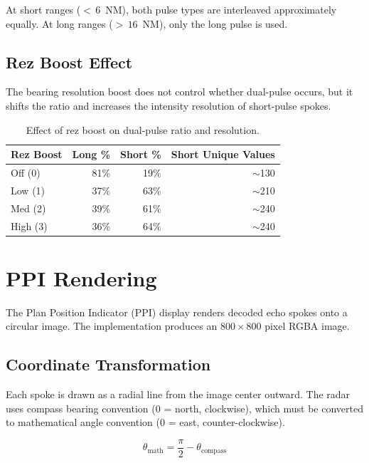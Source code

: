 \documentclass[11pt,letterpaper]{article}
\begin{document}
At short ranges (${<}\,6$~NM), both pulse types are interleaved approximately equally. At long ranges (${>}\,16$~NM), only the long pulse is used.

\subsection{Rez Boost Effect}

The bearing resolution boost does not control whether dual-pulse occurs, but it shifts the ratio and increases the intensity resolution of short-pulse spokes.

\begin{table}[h]
\centering
\caption{Effect of rez boost on dual-pulse ratio and resolution.}
\label{tab:rezboost}
\begin{tabular}{@{}lrrr@{}}
\toprule
\textbf{Rez Boost} & \textbf{Long \%} & \textbf{Short \%} & \textbf{Short Unique Values} \\
\midrule
Off (0) & 81\% & 19\% & $\sim$130 \\
Low (1) & 37\% & 63\% & $\sim$210 \\
Med (2) & 39\% & 61\% & $\sim$240 \\
High (3) & 36\% & 64\% & $\sim$240 \\
\bottomrule
\end{tabular}
\end{table}


\section{PPI Rendering}

The Plan Position Indicator (PPI) display renders decoded echo spokes onto a circular image. The implementation produces an $800 \times 800$ pixel RGBA image.

\subsection{Coordinate Transformation}

Each spoke is drawn as a radial line from the image center outward. The radar uses compass bearing convention (0 = north, clockwise), which must be converted to mathematical angle convention (0 = east, counter-clockwise).

\begin{equation}
\theta_{\text{math}} = \frac{\pi}{2} - \theta_{\text{compass}}
\end{equation}
\end{document}
